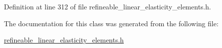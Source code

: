 Definition at line 312 of file refineable\+\_\+linear\+\_\+elasticity\+\_\+elements.\+h.



The documentation for this class was generated from the following file\+:\begin{DoxyCompactItemize}
\item 
\hyperlink{refineable__linear__elasticity__elements_8h}{refineable\+\_\+linear\+\_\+elasticity\+\_\+elements.\+h}\end{DoxyCompactItemize}
